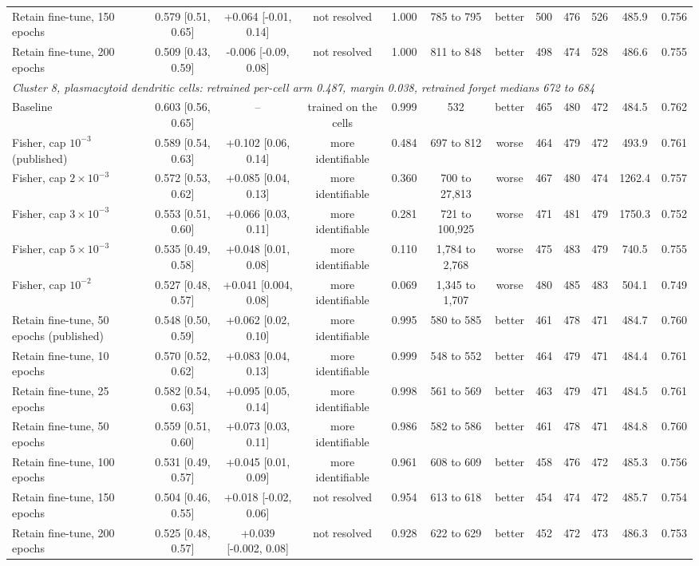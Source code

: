 \begin{tabular}{lccccccccccc}
Retain fine-tune, 150 epochs & 0.579 [0.51, 0.65] & +0.064 [-0.01, 0.14] & not resolved & 1.000 & 785 to 795 & better & 500 & 476 & 526 & 485.9 & 0.756 \\
Retain fine-tune, 200 epochs & 0.509 [0.43, 0.59] & -0.006 [-0.09, 0.08] & not resolved & 1.000 & 811 to 848 & better & 498 & 474 & 528 & 486.6 & 0.755 \\
\midrule
\multicolumn{12}{l}{\emph{Cluster 8, plasmacytoid dendritic cells: retrained per-cell arm 0.487, margin 0.038, retrained forget medians 672 to 684}} \\
Baseline & 0.603 [0.56, 0.65] & -- & trained on the cells & 0.999 & 532 & better & 465 & 480 & 472 & 484.5 & 0.762 \\
Fisher, cap $10^{-3}$ (published) & 0.589 [0.54, 0.63] & +0.102 [0.06, 0.14] & more identifiable & 0.484 & 697 to 812 & worse & 464 & 479 & 472 & 493.9 & 0.761 \\
Fisher, cap $2\times 10^{-3}$ & 0.572 [0.53, 0.62] & +0.085 [0.04, 0.13] & more identifiable & 0.360 & 700 to 27,813 & worse & 467 & 480 & 474 & 1262.4 & 0.757 \\
Fisher, cap $3\times 10^{-3}$ & 0.553 [0.51, 0.60] & +0.066 [0.03, 0.11] & more identifiable & 0.281 & 721 to 100,925 & worse & 471 & 481 & 479 & 1750.3 & 0.752 \\
Fisher, cap $5\times 10^{-3}$ & 0.535 [0.49, 0.58] & +0.048 [0.01, 0.08] & more identifiable & 0.110 & 1,784 to 2,768 & worse & 475 & 483 & 479 & 740.5 & 0.755 \\
Fisher, cap $10^{-2}$ & 0.527 [0.48, 0.57] & +0.041 [0.004, 0.08] & more identifiable & 0.069 & 1,345 to 1,707 & worse & 480 & 485 & 483 & 504.1 & 0.749 \\
Retain fine-tune, 50 epochs (published) & 0.548 [0.50, 0.59] & +0.062 [0.02, 0.10] & more identifiable & 0.995 & 580 to 585 & better & 461 & 478 & 471 & 484.7 & 0.760 \\
Retain fine-tune, 10 epochs & 0.570 [0.52, 0.62] & +0.083 [0.04, 0.13] & more identifiable & 0.999 & 548 to 552 & better & 464 & 479 & 471 & 484.4 & 0.761 \\
Retain fine-tune, 25 epochs & 0.582 [0.54, 0.63] & +0.095 [0.05, 0.14] & more identifiable & 0.998 & 561 to 569 & better & 463 & 479 & 471 & 484.5 & 0.761 \\
Retain fine-tune, 50 epochs & 0.559 [0.51, 0.60] & +0.073 [0.03, 0.11] & more identifiable & 0.986 & 582 to 586 & better & 461 & 478 & 471 & 484.8 & 0.760 \\
Retain fine-tune, 100 epochs & 0.531 [0.49, 0.57] & +0.045 [0.01, 0.09] & more identifiable & 0.961 & 608 to 609 & better & 458 & 476 & 472 & 485.3 & 0.756 \\
Retain fine-tune, 150 epochs & 0.504 [0.46, 0.55] & +0.018 [-0.02, 0.06] & not resolved & 0.954 & 613 to 618 & better & 454 & 474 & 472 & 485.7 & 0.754 \\
Retain fine-tune, 200 epochs & 0.525 [0.48, 0.57] & +0.039 [-0.002, 0.08] & not resolved & 0.928 & 622 to 629 & better & 452 & 472 & 473 & 486.3 & 0.753 \\
\bottomrule
\end{tabular}
